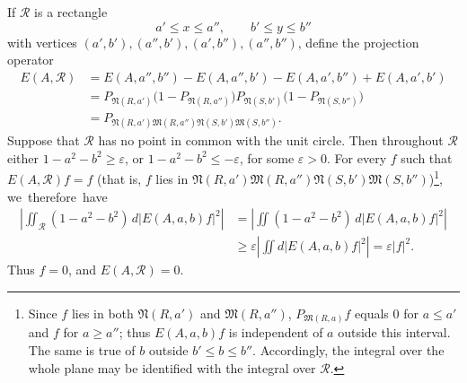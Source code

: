 ﻿\documentclass[paper=b5,fontsize=13pt,bookmarkpackage=false,twoside]{scrartcl}
\newcounter{translatornote}
\begin{document}
If \(\mathcal R\) is a rectangle
\[
  a'\leq x\leq a'',\qquad b'\leq y\leq b''
\]
with vertices
\((a',b'),(a'',b'),(a',b''),(a'',b'')\), define the projection
operator
\begin{align*}
 E(A,\mathcal R)
 &=E(A,a'',b'')-E(A,a'',b')-E(A,a',b'')+E(A,a',b')\\
 &=P_{\mathfrak N(R,a')}\bigl(1-P_{\mathfrak N(R,a'')}\bigr)
   P_{\mathfrak N(S,b')}\bigl(1-P_{\mathfrak N(S,b'')}\bigr)\\
 &=P_{\mathfrak N(R,a')\mathfrak M(R,a'')
                   \mathfrak N(S,b')\mathfrak M(S,b'')}.
\end{align*}
Suppose that \(\mathcal R\) has no point in common with the unit circle.
Then throughout \(\mathcal R\) either
\(1-a^2-b^2\geq\varepsilon\), or
\(1-a^2-b^2\leq-\varepsilon\), for some \(\varepsilon>0\).
For every \(f\) such that \(E(A,\mathcal R)f=f\) (that is, \(f\) lies
in
\(\mathfrak N(R,a')\mathfrak M(R,a'')
  \mathfrak N(S,b')\mathfrak M(S,b'')\))\footnote{\label{fn:69}Since \(f\) lies in both
\(\mathfrak N(R,a')\) and \(\mathfrak M(R,a'')\),
\(P_{\mathfrak M(R,a)}f\) equals \(0\) for \(a\leq a'\) and \(f\) for
\(a\geq a''\); thus \(E(A,a,b)f\) is independent of \(a\) outside this
interval.  The same is true of \(b\) outside \(b'\leq b\leq b''\).
Accordingly, the integral over the whole plane may be identified with
the integral over \(\mathcal R\).}, \mbox{we therefore have}
\begin{align*}
 \left|\iint_{\mathcal R}(1-a^2-b^2)\,
           d|E(A,a,b)f|^2\right|
 &=\left|\iint(1-a^2-b^2)\,d|E(A,a,b)f|^2\right|\\
 &\geq\varepsilon
   \left|\iint d|E(A,a,b)f|^2\right|
  =\varepsilon|f|^2.
\end{align*}
Thus \(f=0\), and \(E(A,\mathcal R)=0\).
\end{document}
